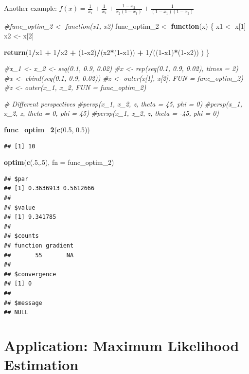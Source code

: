 \documentclass[11pt,]{article}
\newenvironment{Shaded}{\begin{snugshade}}{\end{snugshade}}
\newcommand{\KeywordTok}[1]{\textcolor[rgb]{0.13,0.29,0.53}{\textbf{#1}}}
\newcommand{\DataTypeTok}[1]{\textcolor[rgb]{0.13,0.29,0.53}{#1}}
\newcommand{\DecValTok}[1]{\textcolor[rgb]{0.00,0.00,0.81}{#1}}
\newcommand{\FloatTok}[1]{\textcolor[rgb]{0.00,0.00,0.81}{#1}}
\newcommand{\StringTok}[1]{\textcolor[rgb]{0.31,0.60,0.02}{#1}}
\newcommand{\CommentTok}[1]{\textcolor[rgb]{0.56,0.35,0.01}{\textit{#1}}}
\newcommand{\ControlFlowTok}[1]{\textcolor[rgb]{0.13,0.29,0.53}{\textbf{#1}}}
\newcommand{\OperatorTok}[1]{\textcolor[rgb]{0.81,0.36,0.00}{\textbf{#1}}}
\newcommand{\NormalTok}[1]{#1}
\begin{document}
Another example:
\(f(x) = \frac{1}{x_1}+\frac{1}{x_2}+\frac{1-x_2}{x_2(1-x_1)}+\frac{1}{(1-x_1)(1-x_2)}\)

\begin{Shaded}
\begin{Highlighting}[]
\CommentTok{#func_optim_2 <- function(x1, x2) }
\NormalTok{func_optim_}\DecValTok{2}\NormalTok{ <-}\StringTok{ }\ControlFlowTok{function}\NormalTok{(x) }
\NormalTok{\{}
\NormalTok{  x1 <-}\StringTok{ }\NormalTok{x[}\DecValTok{1}\NormalTok{]}
\NormalTok{  x2 <-}\StringTok{ }\NormalTok{x[}\DecValTok{2}\NormalTok{]}
  
  \KeywordTok{return}\NormalTok{(}\DecValTok{1}\OperatorTok{/}\NormalTok{x1 }\OperatorTok{+}\StringTok{ }\DecValTok{1}\OperatorTok{/}\NormalTok{x2 }\OperatorTok{+}\StringTok{ }
\StringTok{    }\NormalTok{(}\DecValTok{1}\OperatorTok{-}\NormalTok{x2)}\OperatorTok{/}\NormalTok{(x2}\OperatorTok{*}\NormalTok{(}\DecValTok{1}\OperatorTok{-}\NormalTok{x1)) }\OperatorTok{+}\StringTok{ }
\StringTok{    }\DecValTok{1}\OperatorTok{/}\NormalTok{((}\DecValTok{1}\OperatorTok{-}\NormalTok{x1)}\OperatorTok{*}\NormalTok{(}\DecValTok{1}\OperatorTok{-}\NormalTok{x2))}
\NormalTok{    )}
\NormalTok{\}}

\CommentTok{#x_1 <- x_2 <- seq(0.1, 0.9, 0.02)}
\CommentTok{#x <- rep(seq(0.1, 0.9, 0.02), times = 2)}
\CommentTok{#x <- cbind(seq(0.1, 0.9, 0.02))}
\CommentTok{#z <- outer(x[1], x[2], FUN = func_optim_2)}
\CommentTok{#z <- outer(x_1, x_2, FUN = func_optim_2)}

\CommentTok{# Different perspectives}
\CommentTok{#persp(x_1, x_2, z, theta = 45, phi = 0) }
\CommentTok{#persp(x_1, x_2, z, theta = 0, phi = 45)}
\CommentTok{#persp(x_1, x_2, z, theta = -45, phi = 0)}

\KeywordTok{func_optim_2}\NormalTok{(}\KeywordTok{c}\NormalTok{(}\FloatTok{0.5}\NormalTok{, }\FloatTok{0.5}\NormalTok{))}
\end{Highlighting}
\end{Shaded}

\begin{verbatim}
## [1] 10
\end{verbatim}

\begin{Shaded}
\begin{Highlighting}[]
\KeywordTok{optim}\NormalTok{(}\KeywordTok{c}\NormalTok{(.}\DecValTok{5}\NormalTok{,.}\DecValTok{5}\NormalTok{), }\DataTypeTok{fn =}\NormalTok{ func_optim_}\DecValTok{2}\NormalTok{)}
\end{Highlighting}
\end{Shaded}

\begin{verbatim}
## $par
## [1] 0.3636913 0.5612666
## 
## $value
## [1] 9.341785
## 
## $counts
## function gradient 
##       55       NA 
## 
## $convergence
## [1] 0
## 
## $message
## NULL
\end{verbatim}

\section{Application: Maximum Likelihood
Estimation}\label{application-maximum-likelihood-estimation}
\end{document}
